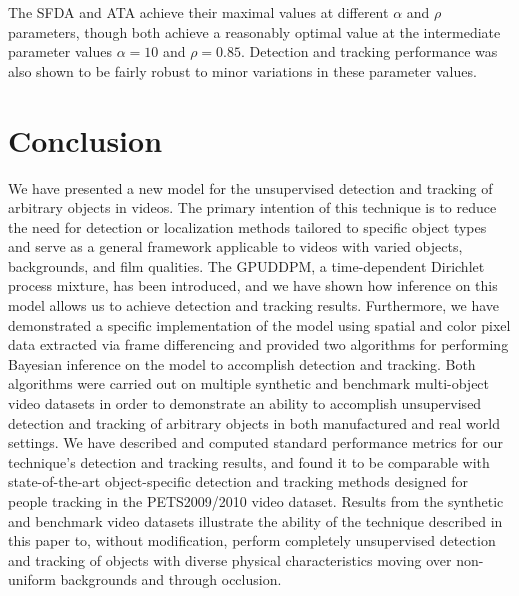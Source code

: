 \documentclass[twocolumn, final]{svjour3}
\begin{document}
The SFDA and ATA achieve their maximal values at different $\alpha$ and $\rho$ parameters, though both achieve a reasonably optimal value at the intermediate parameter values $\alpha = 10$ and $\rho = 0.85$. Detection and tracking performance was also shown to be fairly robust to minor variations in these parameter values.



\section{Conclusion}
\label{sec:conclusion}

We have presented a new model for the unsupervised detection and tracking of arbitrary objects in videos. The primary intention of this technique is to reduce the need for detection or localization methods tailored to specific object types and serve as a general framework applicable to videos with varied objects, backgrounds, and film qualities. The GPUDDPM, a time-dependent Dirichlet process mixture, has been introduced, and we have shown how inference on this model allows us to achieve detection and tracking results. Furthermore, we have demonstrated a specific implementation of the model using spatial and color pixel data extracted via frame differencing and provided two algorithms for performing Bayesian inference on the model to accomplish detection and tracking. Both algorithms were carried out on multiple synthetic and benchmark multi-object video datasets in order to demonstrate an ability to accomplish unsupervised detection and tracking of arbitrary objects in both manufactured and real world settings. We have described and computed standard performance metrics for our technique's detection and tracking results, and found it to be comparable with state-of-the-art object-specific detection and tracking methods designed for people tracking in the PETS2009/2010 video dataset. Results from the synthetic and benchmark video datasets illustrate the ability of the technique described in this paper to, without modification, perform completely unsupervised detection and tracking of objects with diverse physical characteristics moving over non-uniform backgrounds and through occlusion.


\begin{small}

 
\end{small}



\end{document}
